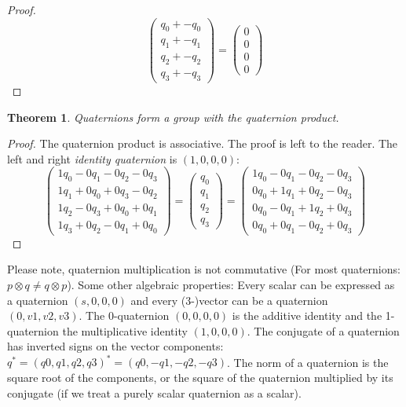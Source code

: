 \documentclass{amsart}
\newtheorem{theorem}{Theorem}[section]
\theoremstyle{definition}
\theoremstyle{remark}
\numberwithin{equation}{section}
\begin{document}
\begin{proof}
  \begin{equation}
    \begin{pmatrix}
      q_0 + -q_0 \\
      q_1 + -q_1 \\
      q_2 + -q_2 \\
      q_3 + -q_3
    \end{pmatrix} =
    \begin{pmatrix}
      0 \\
      0 \\
      0 \\
      0
    \end{pmatrix}
  \end{equation}
\end{proof}

\begin{theorem}
  Quaternions form a group with the quaternion product.
\end{theorem}
\begin{proof}
  The quaternion product is associative. The proof is left to the reader. The left and right \emph{identity quaternion} is $(1, 0, 0, 0)$:
  \begin{equation}
    \begin{pmatrix}
      1q_0 - 0q_1 - 0q_2 - 0q_3 \\
      1q_1 + 0q_0 + 0q_3 - 0q_2 \\
      1q_2 - 0q_3 + 0q_0 + 0q_1 \\
      1q_3 + 0q_2 - 0q_1 + 0q_0
    \end{pmatrix} =
    \begin{pmatrix}
      q_0 \\
      q_1 \\
      q_2 \\
      q_3
    \end{pmatrix} =  
    \begin{pmatrix}
      1q_0 - 0q_1 - 0q_2 - 0q_3 \\
      0q_0 + 1q_1 + 0q_2 - 0q_3 \\
      0q_0 - 0q_1 + 1q_2 + 0q_3 \\
      0q_0 + 0q_1 - 0q_2 + 0q_3
    \end{pmatrix}
  \end{equation}
\end{proof}


Please note, quaternion multiplication is not commutative (For most quaternions: $p\otimes q\neq q \otimes p$). Some other algebraic properties:
Every scalar can be expressed as a quaternion $(s, 0, 0, 0)$ and every (3-)vector can be a quaternion $(0, v1, v2, v3)$. The 0-quaternion $(0, 0, 0, 0)$ is the additive identity and the 1-quaternion the multiplicative identity $(1, 0, 0, 0)$. The conjugate of a quaternion has inverted signs on the vector components: $q^*=(q0, q1, q2, q3)^*=(q0, -q1, -q2, -q3)$. The norm of a quaternion is the square root of the components, or the square of the quaternion multiplied by its conjugate (if we treat a purely scalar quaternion as a scalar).
\end{document}
